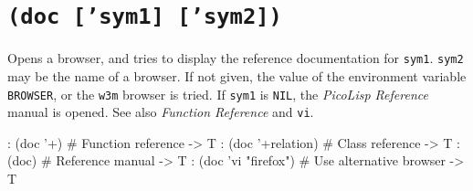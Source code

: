  
\section*{\texttt{(doc ['sym1] ['sym2])}}
\label{sec:func-ref-D-(doc ['sym1] ['sym2])}


Opens a browser, and tries to display the reference documentation for
\texttt{sym1}. \texttt{sym2} may be the name of a browser. If not given, the value of
the environment variable \texttt{BROWSER}, or the \texttt{w3m} browser is tried. If
\texttt{sym1} is \texttt{NIL}, the \emph{PicoLisp Reference} manual is opened.
See also \emph{Function Reference} and \texttt{vi}.


\begin{wideverbatim}
: (doc '+)  # Function reference
-> T
: (doc '+relation)  # Class reference
-> T
: (doc)  # Reference manual
-> T
:  (doc 'vi "firefox")  # Use alternative browser
-> T
\end{wideverbatim}




% 
   